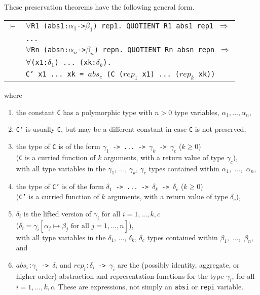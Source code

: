 \documentclass[envcountsame,runningheads]{llncs}
\begin{document}
These preservation theorems have the following general form.
\begin{center}
\begin{tabular}{rl}
$\vdash$
& {\tt $\forall$R1 (abs1:$\alpha_1$->$\beta_1$) rep1. QUOTIENT R1 abs1 rep1 $\Rightarrow$} \\
& {\tt ...} \\
& {\tt $\forall$Rn (absn:$\alpha_n$->$\beta_n$) repn. QUOTIENT Rn absn repn $\Rightarrow$} \\
& {\tt $\forall$(x1:$\delta_1$) ... (xk:$\delta_k$).}  \\
& \hspace{17mm}
{\tt C' x1 ... xk = $abs_c$ (C ($rep_1$ x1) ... ($rep_k$ xk)) }  \\
\end{tabular}
\end{center}
where
\begin{enumerate}
\item
the constant {\tt C} has a polymorphic type with $n>0$ type variables,
$\alpha_1, ..., \alpha_n$,
\item
{\tt C'} is usually {\tt C}, but may be a different constant
in case {\tt C} is not preserved,
\item
the type of {\tt C} is of the form
{\tt $\gamma_1$ -> ... -> $\gamma_k$ -> $\gamma_c$} ($k \ge 0$) \\
({\tt C} is a curried function of $k$ arguments, with a return value of
type $\gamma_c$), \\
with
all type variables in the $\gamma_1$, ..., $\gamma_k$, $\gamma_c$ types
contained within $\alpha_1$,~...,~$\alpha_n$,
\item
the type of {\tt C'} is of the form
{\tt $\delta_1$ -> ... -> $\delta_k$ -> $\delta_c$} ($k \ge 0$) \\
({\tt C'} is a curried function of $k$ arguments, with a return value of
type $\delta_c$),
\item
$\delta_i$ is the lifted version of $\gamma_i$ for all $i=1,...,k,c$ \\
($\delta_i = \gamma_i[\alpha_j \mapsto \beta_j \mbox{\ for all\ } j=1,...,n]$),
\\
with
all type variables in the $\delta_1$, ..., $\delta_k$, $\delta_c$ types
contained within $\beta_1$,~...,~$\beta_n$,
and
\item
{\tt $abs_i$:$\gamma_i$ -> $\delta_i$} and
{\tt $rep_i$:$\delta_i$ -> $\gamma_i$}
are the (possibly identity, aggregate, or higher-order)
abstraction and representation functions
for the type $\gamma_i$, for all $i=1,...,k,c$.
These are expressions, not simply an
{\tt absi} or {\tt repi} variable.
\end{enumerate}
\end{document}
